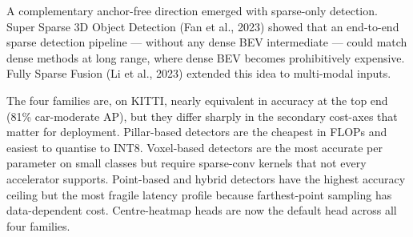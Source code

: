 A complementary anchor-free direction emerged with sparse-only detection. Super Sparse 3D Object Detection (Fan et al., 2023) showed that an end-to-end sparse detection pipeline --- without any dense BEV intermediate --- could match dense methods at long range, where dense BEV becomes prohibitively expensive. Fully Sparse Fusion (Li et al., 2023) extended this idea to multi-modal inputs.

The four families are, on KITTI, nearly equivalent in accuracy at the top end (81\% car-moderate AP), but they differ sharply in the secondary cost-axes that matter for deployment. Pillar-based detectors are the cheapest in FLOPs and easiest to quantise to INT8. Voxel-based detectors are the most accurate per parameter on small classes but require sparse-conv kernels that not every accelerator supports. Point-based and hybrid detectors have the highest accuracy ceiling but the most fragile latency profile because farthest-point sampling has data-dependent cost. Centre-heatmap heads are now the default head across all four families.


